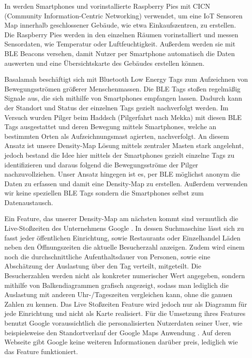 \documentclass[conference,compsoc]{IEEEtran}
\begin{document}
In \cite{CICN} werden Smartphones und vorinstallierte Raspberry Pies mit CICN (Community Information-Centric Networking) verwendet,
um eine IoT Sensoren Map innerhalb geschlossener Gebäude, wie etwa Einkaufszentren, zu erstellen. 
Die Raspberry Pies werden in den einzelnen Räumen vorinstalliert und messen Sensordaten, wie Temperatur oder Luftfeuchtigkeit. 
Außerdem werden sie mit BLE Beacons versehen, damit Nutzer per Smartphone automatisch die Daten auswerten und eine Übersichtskarte des Gebäudes erstellen können.

Basalamah \cite{BLETags} beschäftigt sich mit Bluetooth Low Energy Tags zum Aufzeichnen von Bewegungsströmen größerer Menschenmassen.
Die BLE Tags stoßen regelmäßig Signale aus, die sich mithilfe von Smartphones empfangen lassen. 
Dadurch kann der Standort und Status der einzelnen Tags gezielt nachverfolgt werden. 
Im Versuch wurden Pilger beim Haddsch (Pilgerfahrt nach Mekka) mit diesen BLE Tags ausgestattet und deren Bewegung mittels Smartphones, welche an bestimmten Orten als Aufzeichnungsmast agierten, nachverfolgt. 
An diesem Ansatz ist unsere Density-Map Lösung mittels zentraler Masten stark angelehnt, jedoch bestand die Idee hier mittels der Smartphones gezielt einzelne Tags zu identifizieren und daraus folgend die Bewegungsströme der Pilger nachzuvollziehen. 
Unser Ansatz hingegen ist es, per BLE möglichst anonym die Daten zu erfassen und damit eine Density-Map zu erstellen. 
Außerdem verwenden wir keine speziellen BLE Tags sondern die Smartphones selbst zum Datenaustausch. 

Ein Feature, das unserer Density-Map am nächsten kommt sind vermutlich die Live-Stoßzeiten des Unternehmens Google \cite{GoogleStosszeiten}.  
In dessen Suchmaschine lässt sich zu fasst jeder öffentlichen Einrichtung, sowie Restaurants oder Einzelhandel Läden neben den Öffnungszeiten die aktuelle Besucherzahl anzeigen. 
Zudem wird einem noch die durchschnittliche Aufenthaltsdauer von Personen, sowie eine Abschätzung der Auslastung über den Tag verteilt, mitgeteilt. 
Die Besucherzahlen werden nicht als konkreter numerischer Wert angegeben, sondern mithilfe von Balkendiagrammen grafisch angezeigt, sodass man lediglich die Auslastung mit anderen Uhr-/Tageszeiten vergleichen kann, ohne die ganuen Zahlen zu kennen. 
Das Live Stoßzeiten Feature wird jedoch nur als Diagramm für jede Einrichtung und nicht als Karte realisiert.
Für die Umsetzung ihres Features benutzt Google voraussichtlich die personalisierten Nutzerdaten seiner User, wie beispielsweise den Standortverlauf der Google Maps Anwendung \cite{GoogleStandortverlauf}. 
Auf deren Webseite gibt Google keine weiteren Informationen darüber preis, lediglich wie das Feature funktioniert. 
\end{document}
